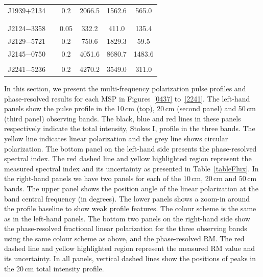 \documentclass[useAMS,usenatbib]{mn2e}
\begin{document}
\begin{appendix}
\begin{table}
\begin{tabular}{lccccc}
J1939$+$2134 & \citet{Thorsett90,Xilouris98}       & 0.2   &     2066.5 	 &    1562.6  	&      565.0    \\  
             & \citet{Stairs99,Ord04,Yan11}        &       &               &              &               \\
             &                                     &       &               &              &               \\
J2124$-$3358 & \citet{Manchester04,Ord04,Yan11}    & 0.05  &      332.2 	 &     411.0  	&      135.4    \\  
J2129$-$5721 & \citet{Manchester04,Ord04,Yan11}    & 0.2   &      750.6 	 &    1829.3  	&       59.5    \\  
J2145$-$0750 & \citet{Xilouris98,Stairs99}         & 0.2   &     4051.6 	 &    8680.7  	&     1483.6    \\  
             & \citet{Manchester04,Ord04,Yan11}    &       &               &              &               \\
J2241$-$5236 & \citet{Keith11}                     & 0.2   &     4270.2 	 &    3549.0  	&      311.0    \\
\hline
\end{tabular}
\end{table}


In this section, we present the multi-frequency polarization pulse profiles and phase-resolved results 
for each MSP in Figures~\ref{0437} to~\ref{2241}. 
%
The left-hand panels show the pulse profile in the 10\,cm (top), 20\,cm 
(second panel) and 50\,cm (third panel) observing bands. The black, blue and red 
lines in these panels respectively indicate the total intensity, Stokes I, profile in the three bands. 
The yellow line indicates linear polarization and the grey line shows circular polarization. 
The bottom panel on the left-hand side presents the phase-resolved spectral index.   
The red dashed line and yellow highlighted region represent the measured spectral 
index and its uncertainty as presented in Table~\ref{tableFlux}.
%
In the right-hand panels we have two panels for each of the 10\,cm, 20\,cm and 50\,cm bands. 
The upper panel shows the position angle of the linear polarization at the 
band central frequency (in degrees).
%
The lower panels shows a zoom-in around the profile baseline to show weak profile 
features. The colour scheme is the same as in the left-hand panels.   
%
The bottom two panels on the right-hand side show the phase-resolved fractional 
linear polarization for the three observing bands using the same colour scheme as above, 
and the phase-resolved RM. The red dashed line and yellow highlighted region represent the 
measured RM value and its uncertainty. 
%
In all panels, vertical dashed lines show the positions of peaks in the 20\,cm total intensity profile.


\end{appendix}
\end{document}
